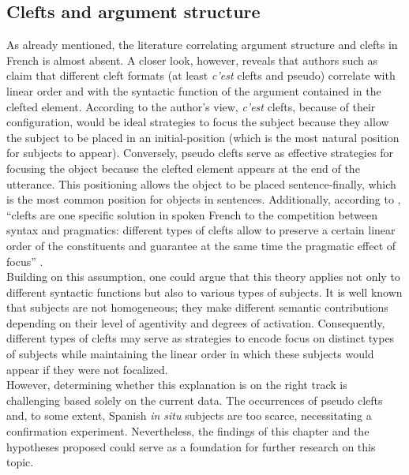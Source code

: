 \subsection{Clefts and argument structure}
As already mentioned, the literature correlating argument structure and clefts in French is almost absent. A closer look, however, reveals that authors such as \textcite{hetzron1975presentative} claim that different cleft formats (at least \textit{c'est} clefts and pseudo) correlate with linear order and with the syntactic function of the argument contained in the clefted element. According to the author's view, \textit{c'est} clefts, because of their configuration, would be ideal strategies to focus the subject because they allow the subject to be placed in an initial-position (which is the most natural position for subjects to appear). Conversely, pseudo clefts serve as effective strategies for focusing the object because the clefted element appears at the end of the utterance. This positioning allows the object to be placed sentence-finally, which is the most common position for objects in sentences. Additionally, according to \textcite{lambrecht1996information}, ``clefts are one specific solution in spoken French to the competition between syntax and pragmatics: different types of clefts allow to preserve a certain linear order of the constituents and guarantee at the same time the pragmatic effect of focus” \parencite[25]{lambrecht1996information}.\\
Building on this assumption, one could argue that this theory applies not only to different syntactic functions but also to various types of subjects. It is well known that subjects are not homogeneous; they make different semantic contributions depending on their level of agentivity and degrees of activation. Consequently, different types of clefts may serve as strategies to encode focus on distinct types of subjects while maintaining the linear order in which these subjects would appear if they were not focalized.\\
However, determining whether this explanation is on the right track is challenging based solely on the current data. The occurrences of pseudo clefts and, to some extent, Spanish \textit{in situ} subjects are too scarce, necessitating a confirmation experiment. Nevertheless, the findings of this chapter and the hypotheses proposed could serve as a foundation for further research on this topic.

